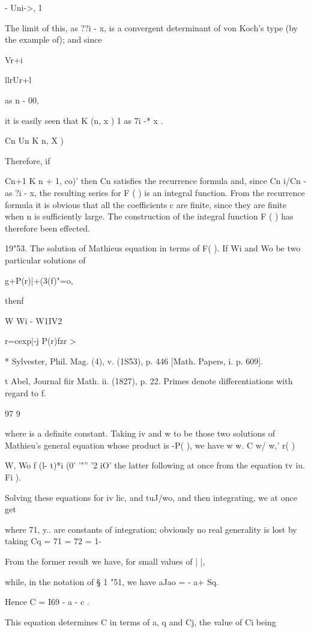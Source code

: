 - Uni->, 1

The limit of this, as ??i - x, is a convergent determinant of von
Koch's type (by the example of); and since

Vr+i

llrUr+l

as n - 00,

it is easily seen that K (n, x ) 1 as 7i -* x .

Cn Un K n, X )

Therefore, if

Cn+1 K n + 1, co)' then Cn satisfies the recurrence formula and, since
Cn i/Cn - as ?i - x, the resulting series for F ( ) is an integral
function. From the recurrence formula it is obvious that all the
coefficients c are finite, since they are finite when n is
sufficiently large. The construction of the integral function F ( )
has therefore been effected.

19"53. The solution of Mathieus equation in terms of F( ). If Wi and
Wo be two particular solutions of

g+P(r)|+(3(f)"=o,

thenf

W Wi - W1IV2

r=cexp|-j P(r)fzr >

* Sylvester, Phil. Mag. (4), v. (1S53), p. 446 [Math. Papers, i. p.
609].

t Abel, Journal fiir Math. ii. (1827), p. 22. Primes denote
differentiations with regard to f.

97 9

%
%

where is a definite constant. Taking iv and w to be those two
solutions of Mathieu's general equation whose product is -P( ), we
have w w. C w/ w,' r( )

W, Wo f (l- t)*i (0' '"'' '2 iO' the latter following at once from the
equation tv iu. Fi ).

Solving these equations for iv lic, and tuJ/wo, and then integrating,
we at once get

where 71, y.. are constants of integration; obviously no real
generality is lost by taking Cq = 71 = 72 = 1-

From the former result we have, for small values of | |,

while, in the notation of § 1 "51, we have aJao = - a+ Sq.

Hence C = I69 - a - c .

This equation determines C in terms of a, q and Cj, the value of Ci
being

